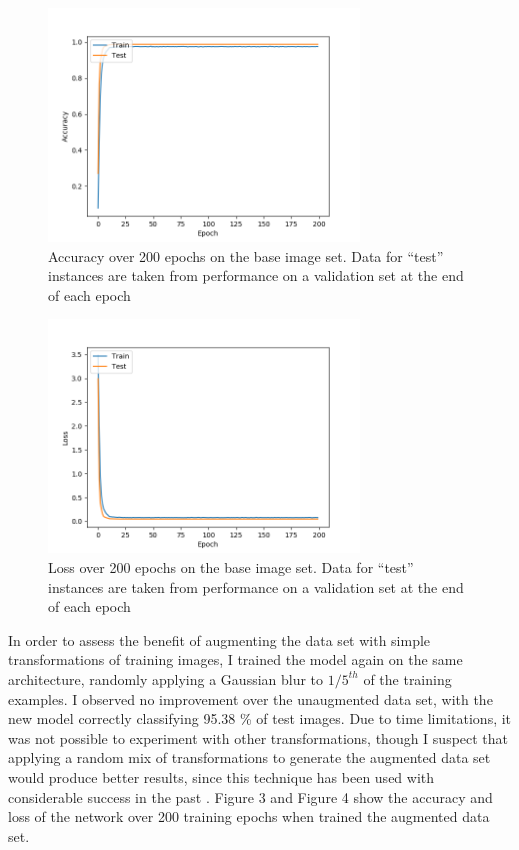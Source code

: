 \documentclass[letterpaper,twocolumn,10pt]{article}
\begin{document}
\begin{figure}
\includegraphics[width=3.25in]{accuracy}
\caption{Accuracy over 200 epochs on the base image set. Data for ``test'' instances are taken from performance on a validation set at the end of each epoch}
\end{figure}

\begin{figure}
\includegraphics[width=3.25in]{loss}
\caption{Loss over 200 epochs on the base image set. Data for ``test'' instances are taken from performance on a validation set at the end of each epoch}
\end{figure}

In order to assess the benefit of augmenting the data set with simple transformations of training images, I trained the model again on the same architecture, randomly applying a Gaussian blur to $1/5^{th}$ of the training examples. I observed no improvement over the unaugmented data set, with the new model correctly classifying 95.38 \% of test images. Due to time limitations, it was not possible to experiment with other transformations, though I suspect that applying a random mix of transformations to generate the augmented data set would produce better results, since this technique has been used with considerable success in the past \cite{ciresan_committee_2011, sermanet_convolutional_2012}. Figure 3 and Figure 4 show the accuracy and loss of the network over 200 training epochs when trained the augmented data set.
\end{document}
